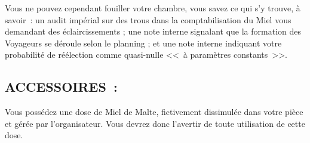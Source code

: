 \documentclass[14pt,twocolumn]{extarticle}
\begin{document}
Vous ne pouvez cependant fouiller votre chambre, vous savez ce qui s'y trouve,
à savoir~: un audit impérial sur des trous dans la comptabilisation du Miel
vous demandant des éclaircissements ; une note interne signalant que la
formation des Voyageurs se déroule selon le planning ; et une note interne
indiquant votre probabilité de réélection comme quasi-nulle
<<~à paramètres constants~>>.

\subsection{ACCESSOIRES~:}

Vous possédez une dose de Miel de Malte, fictivement dissimulée dans votre
pièce et gérée par l'organisateur. Vous devrez donc l'avertir de toute
utilisation de cette dose.
\end{document}

